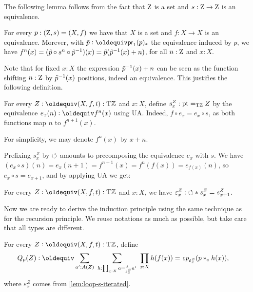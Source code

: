 \documentclass[a4,12pt]{amsart}
\begin{document}
The following lemma follows from the fact that $\mathrm{Z}$ is a set
and $s: \mathrm{Z}\to\mathrm{Z}$ is an equivalence.
\begin{lemma}\label{lem:loop-s-iterated}
For every $p: (\mathrm{Z},s)=(X,f)$ we have that $X$ is a set
and $f: X\to X$ is an equivalence.
Morever, with $\ptoe{p}\defeq \mathsf{pr}_1(p)_*$ the equivalence induced by $p$, we have 
$f^n(x) = (\tilde {p}\circ s^n \circ \tilde {p}^{-1})(x) = \tilde {p}(\tilde {p}^{-1}(x)+n)$, 
for all $n:\mathrm{Z}$ and $x:X$.
\end{lemma}
Note that for fixed $x:X$ the expression $\tilde {p}^{-1}(x)+n$ can be seen as 
the function shifting $n:\mathrm{Z}$ by $\tilde {p}^{-1}(x)$ positions, indeed an equivalence.
This justifies the following definition.

\begin{definition}\label{def:loop-s-iterated}
For every $Z\defeq(X,f,t):\TorZ$ and $x:X$, 
define $s^Z_x: {\mathord{\mathrm{pt}}} =_{\mathrm{T}\mathbb{Z}} Z$ by the equivalence 
$e_x(n)\defeq f^n(x)$ using UA. 
Indeed, $f\circ e_x = e_x \circ s$, as both functions
map $n$ to $f^{n+1}(x)$. 

For simplicity, we may denote $f^n(x)$ by $x+n$.
\end{definition}

Prefixing $s^Z_x$ by ${\circlearrowleft}$ amounts to
precomposing the equivalence $e_x$ with $s$. We have
$(e_x\circ s)(n) = e_x(n+1) = f^{n+1}(x) = f^n(f(x)) =e_{f(x)}(n)$,
so $e_x\circ s = e_{x+1}$, and by applying UA we get:

\begin{lemma}\label{lem:loop-s-iterated}
  For every $Z\defeq(X,f,t):\TorZ$ and $x:X$, we have
  ${\varepsilon^Z_x}: {\circlearrowleft} * s^Z_x = s^Z_{x+1}$. 
\end{lemma}

Now we are ready to derive the induction principle using the same 
technique as for the recursion principle. We reuse notations as much as
possible, but take care that all types are different.

\begin{definition}\label{def:guided-null-hmtps-dep}
For every $Z\defeq(X,f,t):\TorZ$, define
\begin{align*}\label{eq:TBD}
Q_p(Z)&\defeq \sum_{a' : A(Z)}~\sum_{h : \prod_{x:X} a =^A_{s^Z_x} a'}~\prod_{x:X} h(f(x)) = \cp{\varepsilon^Z_x}(p\cto h(x)),
\end{align*}
where $\varepsilon^Z_x$ comes from \cref{lem:loop-s-iterated}.
\end{definition}
\end{document}

